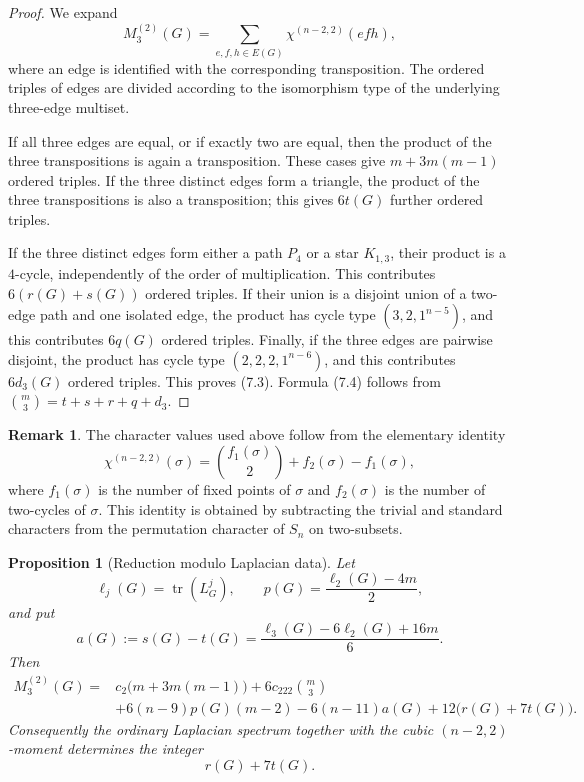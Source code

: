 \documentclass{amsart}
\newtheorem{proposition}{Proposition}
\theoremstyle{definition}
\newtheorem{remark}{Remark}
\newcommand{\tr}{\operatorname{tr}}
\begin{document}
\begin{proof}
We expand
\[
M_3^{(2)}(G)=\sum_{e,f,h\in E(G)}\chi^{(n-2,2)}(efh),
\]
where an edge is identified with the corresponding transposition.
The ordered triples of edges are divided according to the isomorphism type
of the underlying three-edge multiset.

If all three edges are equal, or if exactly two are equal, then the product
of the three transpositions is again a transposition.  These cases give
$m+3m(m-1)$ ordered triples.  If the three distinct edges form a triangle,
the product of the three transpositions is also a transposition; this gives
$6t(G)$ further ordered triples.

If the three distinct edges form either a path $P_4$ or a star $K_{1,3}$,
their product is a $4$-cycle, independently of the order of multiplication.
This contributes $6(r(G)+s(G))$ ordered triples.  If their union is a
disjoint union of a two-edge path and one isolated edge, the product has
cycle type $(3,2,1^{n-5})$, and this contributes $6q(G)$ ordered triples.
Finally, if the three edges are pairwise disjoint, the product has cycle
type $(2,2,2,1^{n-6})$, and this contributes $6d_3(G)$ ordered triples.
This proves (7.3).  Formula (7.4) follows from
$\binom m3=t+s+r+q+d_3$.
\end{proof}

\begin{remark}
The character values used above follow from the elementary identity
\[
\chi^{(n-2,2)}(\sigma)=\binom{f_1(\sigma)}2+f_2(\sigma)-f_1(\sigma),
\]
where $f_1(\sigma)$ is the number of fixed points of $\sigma$ and
$f_2(\sigma)$ is the number of two-cycles of $\sigma$.  This identity is
obtained by subtracting the trivial and standard characters from the
permutation character of $S_n$ on two-subsets.
\end{remark}

\begin{proposition}[Reduction modulo Laplacian data]
Let
\[
\ell_j(G)=\tr(L_G^j),\qquad
p(G)=\frac{\ell_2(G)-4m}{2},
\]
and put
\[
a(G):=s(G)-t(G)
=\frac{\ell_3(G)-6\ell_2(G)+16m}{6}.
\tag{7.5}
\]
Then
\[
\begin{aligned}
M_3^{(2)}(G)={}&
 c_2\bigl(m+3m(m-1)\bigr)
 +6c_{222}\binom m3 \\
&+6(n-9)p(G)(m-2)-6(n-11)a(G)
 +12\bigl(r(G)+7t(G)\bigr).
\end{aligned}
\tag{7.6}
\]
Consequently the ordinary Laplacian spectrum together with the cubic
$(n-2,2)$-moment determines the integer
\[
r(G)+7t(G).
\tag{7.7}
\]
\end{proposition}
\end{document}
